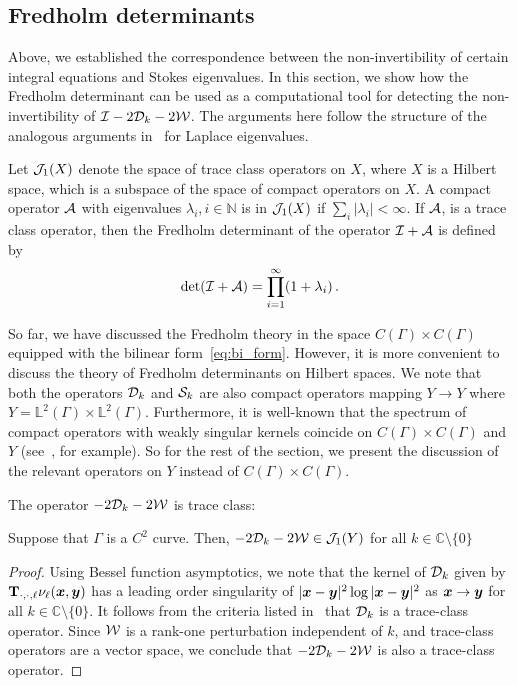 \subsection{Fredholm determinants}
\label{sec:dets}
Above, we established the correspondence between
the non-invertibility of certain integral equations
and Stokes eigenvalues. In this section, we show
how the Fredholm determinant can be used
as a computational tool for detecting the
non-invertibility of $\mathcal I - 2{\mathcal D}_{k} - 2{\mathcal W}$.
The arguments here follow the structure of the
analogous arguments in~\cite{zhao2015robust}
for Laplace eigenvalues.

Let ${\mathcal J}_{1}(X)$ denote the space of trace class operators 
on $X$, where $X$ is a Hilbert space, which is a
subspace of the space of compact operators on $X$.
A compact operator ${\mathcal A}$ with eigenvalues
$\lambda_{i}, i\in \mathbb{N}$ is in ${\mathcal J}_{1}(X)$ if
$\sum_{i} |\lambda_{i}| < \infty$.
If ${\mathcal A}$, is a trace class operator, then  
the Fredholm determinant of the operator $\mathcal I + {\mathcal A}$
is defined by
\begin{equation}
\text{det}(\mathcal I +{\mathcal A}) = \prod_{i=1}^{\infty} (1+\lambda_{i}) \, .
\end{equation}

So far, we have discussed the Fredholm theory in the space
$C(\Gamma)\times C(\Gamma)$ equipped with the bilinear form~\cref{eq:bi_form}.
However, it is more convenient to discuss the theory of Fredholm
determinants on Hilbert spaces. 
We note that both the operators ${\mathcal D}_{k}$ and ${\mathcal S}_{k}$ 
are also compact operators mapping $Y \to Y$
where $Y = \mathbb{L}^{2}(\Gamma) \times \mathbb{L}^{2}(\Gamma)$.
Furthermore, it is well-known that the spectrum of compact
operators with weakly singular kernels coincide on 
$C(\Gamma)\times C(\Gamma)$ and $Y$ (see~\cite{kress1989linear},
for example).
So for the rest of the section, we present the discussion of 
the relevant operators on $Y$ instead of $C(\Gamma)\times C(\Gamma)$.


The operator $-2{\mathcal D}_{k} - 2{\mathcal W}$ is trace class:
\begin{lemma}
  Suppose that $\Gamma$ is a $C^2$ curve.
  Then, $-2{\mathcal D}_{k} - 2{\mathcal W} \in {\mathcal J}_1(Y)$
  for all $k \in \mathbb{C} \setminus \{0\}$ 
\end{lemma}
\begin{proof}
Using Bessel function asymptotics, we note that the
kernel of ${\mathcal D}_{k}$ given by ${\bf T}_{\cdot,\cdot,\ell}\nu_{\ell}({\boldsymbol x},{\boldsymbol y})$
has a leading order singularity of
$|{\boldsymbol x}-{\boldsymbol y}|^2 \log{|{\boldsymbol x}-{\boldsymbol y}|^2}$ as ${\boldsymbol x}\to {\boldsymbol y}$ 
for all $k \in \mathbb{C} \setminus \{ 0\}$.
It follows from the criteria listed
in~\cite[Sec. 2]{bornemann2010numerical} that ${\mathcal D}_{k}$
is a trace-class operator.
Since ${\mathcal W}$ is a rank-one perturbation independent of $k$,
and trace-class operators are a vector space, we conclude
that $-2{\mathcal D}_{k} - 2{\mathcal W}$ is also a trace-class operator.
\end{proof}

